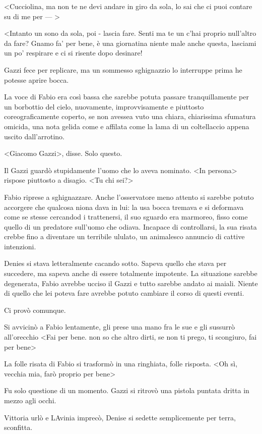 <Cucciolina, ma non te ne devi andare in giro da sola, lo sai che ci puoi contare su di me per --- >

<Intanto un sono da sola, poi - lascia fare. Senti ma te un c'hai proprio null'altro da fare? Gnamo fa' per bene, è una giornatina niente male anche questa, lasciami un po' respirare e ci si risente dopo desinare!

Gazzi fece per replicare, ma un sommesso sghignazzio lo interruppe prima he potesse aprire bocca.

La voce di Fabio era così bassa che sarebbe potuta passare tranquillamente per un borbottio del cielo, nuovamente, improvvisamente e piuttosto coreograficamente coperto, se non avessea vuto una chiara, chiarissima sfumatura omicida, una nota gelida come e affilata come la lama di un coltellaccio appena uscito dall'arrotino.

<Giacomo Gazzi>, disse. Solo questo.

Il Gazzi guardò stupidamente l'uomo che lo aveva nominato. <In persona> rispose piuttosto a disagio. <Tu chi sei?>

Fabio riprese a sghignazzare. Anche l'osservatore meno attento si sarebbe potuto accorgere che qualcosa niona dava in lui: la usa bocca tremava e si deformava come se stesse cercandod i trattenersi, il suo sguardo era marmoreo, fisso come quello di un predatore sull'uomo che odiava. Incapace di controllarsi, la sua risata crebbe fino a diventare un terribile ululato, un animalesco annuncio di cattive intenzioni.

Denies si stava letteralmente cacando sotto. Sapeva quello che stava per succedere, ma sapeva anche di essere totalmente impotente. La situazione sarebbe degenerata, Fabio avrebbe ucciso il Gazzi e tutto sarebbe andato ai maiali. Niente di quello che lei poteva fare avrebbe potuto cambiare il corso di questi eventi.

Ci provò comunque.

Si avvicinò a Fabio lentamente, gli prese una mano fra le sue e gli sussurrò all'orecchio <Fai per bene. non so che altro dirti, se non ti prego, ti scongiuro, fai per bene>

La folle risata di Fabio si trasformò in una ringhiata, folle risposta. <Oh sì, vecchia mia, farò proprio per bene>

Fu solo questione di un momento. Gazzi si ritrovò una pistola puntata dritta in mezzo agli occhi.

Vittoria urlò e LAvinia imprecò, Denise si sedette semplicemente per terra, sconfitta. 

